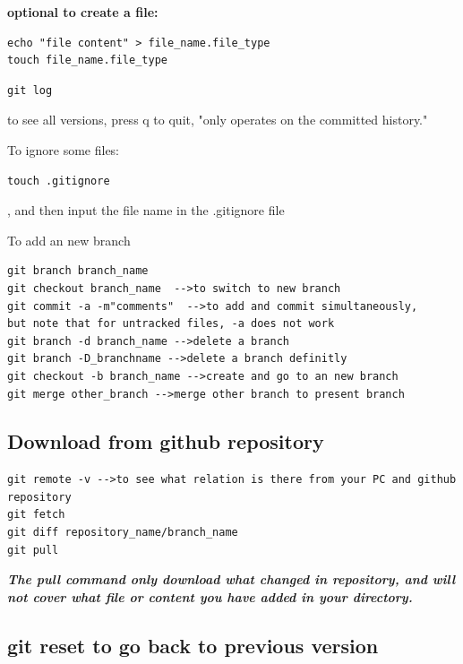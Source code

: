 \documentclass[UTF8]{article}
\begin{document}
\textbf{optional to create a file:}
\begin{verbatim}
echo "file content" > file_name.file_type
touch file_name.file_type
\end{verbatim}

\begin{verbatim}
git log 
\end{verbatim} to see all versions, press q to quit, "only operates on the committed history." 

To ignore some files:
\begin{verbatim}
touch .gitignore
\end{verbatim}, and then input the file name in the .gitignore file

To add an new branch
\begin{verbatim}
git branch branch_name
git checkout branch_name  -->to switch to new branch
git commit -a -m"comments"  -->to add and commit simultaneously, 
but note that for untracked files, -a does not work
git branch -d branch_name -->delete a branch
git branch -D_branchname -->delete a branch definitly
git checkout -b branch_name -->create and go to an new branch
git merge other_branch -->merge other branch to present branch
\end{verbatim}

\subsection{Download from github repository}

\begin{verbatim}
git remote -v -->to see what relation is there from your PC and github repository
git fetch 
git diff repository_name/branch_name
git pull 
\end{verbatim}

\textbf{\textit{The pull command only download what changed in repository, and will not cover what file or content you have added in your directory. }}

\subsection{git reset to go back to previous version}
\end{document}
